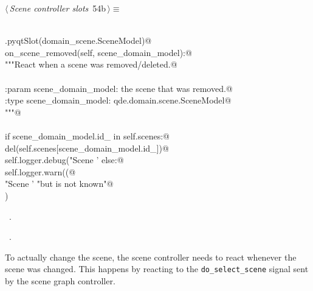 \documentclass[
    a4paper,      %
    10pt,         %
    openright,    %
    notitlepage,  %
    parskip=half, %
]{scrreprt}       %
\theoremstyle{definition}                    %
\begin{document}
\begin{flushleft} \small
\begin{minipage}{\linewidth}\label{scrap85}\raggedright\small
{} $\langle\,${\itshape Scene controller slots}\nobreak\ {\footnotesize {54b}}$\,\rangle\equiv$
\vspace{-1exm}
\begin{list}{}{} \item
\mbox{}\lstinline@@\\
\mbox{}\lstinline@QtCore.pyqtSlot(domain_scene.SceneModel)@\\
\mbox{}\lstinline@def on_scene_removed(self, scene_domain_model):@\\
\mbox{}\lstinline@    """React when a scene was removed/deleted.@\\
\mbox{}\lstinline@@\\
\mbox{}\lstinline@    :param scene_domain_model: the scene that was removed.@\\
\mbox{}\lstinline@    :type scene_domain_model:  qde.domain.scene.SceneModel@\\
\mbox{}\lstinline@    """@\\
\mbox{}\lstinline@@\\
\mbox{}\lstinline@    if scene_domain_model.id_ in self.scenes:@\\
\mbox{}\lstinline@        del(self.scenes[scene_domain_model.id_])@\\
\mbox{}\lstinline@        self.logger.debug("Scene '%s' was removed" % scene_domain_model)@\\
\mbox{}\lstinline@    else:@\\
\mbox{}\lstinline@        self.logger.warn((@\\
\mbox{}\lstinline@            "Scene '%s' should be removed, "@\\
\mbox{}\lstinline@            "but is not known"@\\
\mbox{}\lstinline@        ) % scene_domain_model)@\\
\mbox{}\lstinline@@{\NWsep}
\end{list}
\vspace{-1.5ex}
\footnotesize
\begin{list}{}{\setlength{\itemsep}{-\parsep}\setlength{\itemindent}{-\leftmargin}}
\item \NWtxtMacroDefBy\ .
\item \NWtxtMacroRefIn\ .

\item{}
\end{list}
\end{minipage}\vspace{4ex}
\end{flushleft}
To actually change the scene, the scene controller needs to react whenever the
scene was changed. This happens by reacting to the \verb+do_select_scene+
signal sent by the scene graph controller.
\end{document}
